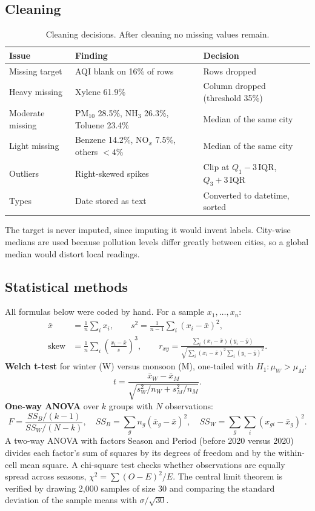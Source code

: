 \documentclass[11pt,a4paper]{article}
\begin{document}
\subsection{Cleaning}
\begin{table}[H]
\centering
\begin{tabular}{@{}lll@{}}
\toprule
Issue & Finding & Decision \\ \midrule
Missing target & AQI blank on 16\% of rows & Rows dropped \\
Heavy missing & Xylene 61.9\% & Column dropped (threshold 35\%) \\
Moderate missing & PM$_{10}$ 28.5\%, NH$_3$ 26.3\%, Toluene 23.4\% & Median of the same city \\
Light missing & Benzene 14.2\%, NO$_x$ 7.5\%, others $<4\%$ & Median of the same city \\
Outliers & Right-skewed spikes & Clip at $Q_1-3\,\mathrm{IQR}$, $Q_3+3\,\mathrm{IQR}$ \\
Types & Date stored as text & Converted to datetime, sorted \\ \bottomrule
\end{tabular}
\caption{Cleaning decisions. After cleaning no missing values remain.}
\end{table}
The target is never imputed, since imputing it would invent labels. City-wise medians are used because pollution levels differ greatly between cities, so a global median would distort local readings.

\subsection{Statistical methods}
All formulas below were coded by hand. For a sample $x_1,\dots,x_n$:
\begin{align}
\bar{x} &= \frac1n\sum_i x_i, \qquad s^2=\frac{1}{n-1}\sum_i (x_i-\bar x)^2,\\
\text{skew} &= \frac1n\sum_i\left(\frac{x_i-\bar x}{s}\right)^3, \qquad
r_{xy}=\frac{\sum_i (x_i-\bar x)(y_i-\bar y)}{\sqrt{\sum_i (x_i-\bar x)^2\sum_i (y_i-\bar y)^2}}.
\end{align}
\textbf{Welch t-test} \cite{welch} for winter (W) versus monsoon (M), one-tailed with $H_1:\mu_W>\mu_M$:
\begin{equation}
t=\frac{\bar x_W-\bar x_M}{\sqrt{s_W^2/n_W+s_M^2/n_M}}.
\end{equation}
\textbf{One-way ANOVA} over $k$ groups with $N$ observations:
\begin{equation}
F=\frac{SS_B/(k-1)}{SS_W/(N-k)},\quad SS_B=\sum_g n_g(\bar x_g-\bar x)^2,\quad SS_W=\sum_g\sum_i (x_{gi}-\bar x_g)^2.
\end{equation}
A two-way ANOVA with factors Season and Period (before 2020 versus 2020) divides each factor's sum of squares by its degrees of freedom and by the within-cell mean square. A chi-square test checks whether observations are equally spread across seasons, $\chi^2=\sum (O-E)^2/E$. The central limit theorem is verified by drawing 2{,}000 samples of size 30 and comparing the standard deviation of the sample means with $\sigma/\sqrt{30}$.
\end{document}
